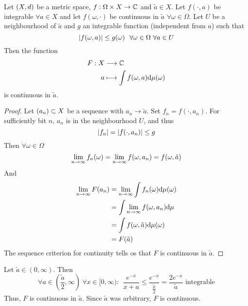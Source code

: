 \documentclass[../../script.tex]{subfiles}
\begin{document}
\begin{cor}
    Let $\metric$ be a metric space, $f: \Omega \times X \rightarrow \cmpln$ and $\tilde{a} \in X$.
    Let $f(\cdot, a)$ be integrable $\forall a \in X$ and let $f(\omega, \cdot)$ be continuous in $\tilde{a}$ $\forall \omega \in \Omega$.
    Let $U$ be a neighbourhood of $\tilde{a}$ and $g$ an integrable function (independent from $a$) such that
    \[
        \abs{f(\omega, a)} \le g(\omega) ~~\forall \omega \in \Omega ~\forall a \in U
    \]
    Then the function 
    \begin{align*}
        F: X &\longrightarrow \cmpln \\
        a &\longmapsto \int f(\omega, a) \dd \mu(\omega)
    \end{align*}
    is continuous in $\tilde{a}$.
\end{cor}
\begin{proof}
    Let $\anyseqdef[a]{X}$ be a sequence with $a_n \rightarrow \tilde{a}$. Set $f_n = f(\cdot, a_n)$. 
    For sufficiently bit $n$, $a_n$ is in the neighbourhood $U$, and thus 
    \begin{equation}
        \abs{f_n} = \abs{f(\cdot, a_n)} \le g
    \end{equation}
    Then $\forall \omega \in \Omega$
    \begin{equation}
        \limn f_n(\omega) = \limn f(\omega, a_n) = f(\omega, \tilde{a})
    \end{equation}
    And 
    \begin{equation}
        \begin{split}
            \limn F(a_n) &= \limn \int f_n(\omega) \dd\mu(\omega) \\
            &= \int \limn f(\omega, a_n) \dd\mu \\
            &= \int f(\omega, \tilde{a}) \dd\mu(\omega) \\
            &= F(\tilde{a})
        \end{split}
    \end{equation}
    The sequence criterion for continuity tells os that $F$ is continuous in $\tilde{a}$.
\end{proof}

\begin{eg}
    Let $\tilde{a} \in (0, \infty)$. Then
    \[
        \forall a \in \left(\frac{\tilde{a}}{2}, \infty\right) ~\forall x \in [0, \infty): ~~\frac{e^{-x}}{x + a} \le \frac{e^{-x}}{\frac{\tilde{a}}{2}} = \frac{2 e^{-x}}{\tilde{a}} \text{ integrable}
    \]
    Thus, $F$ is continuous in $\tilde{a}$. Since $\tilde{a}$ was arbitrary, $F$ is continuous.
\end{eg}
\end{document}
